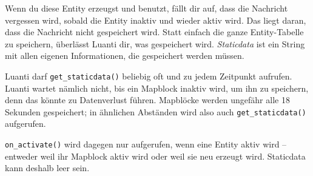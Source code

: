 Wenn du diese Entity erzeugst und benutzt, fällt dir auf, dass die
Nachricht vergessen wird, sobald die Entity inaktiv und wieder aktiv
wird. Das liegt daran, dass die Nachricht nicht gespeichert wird. Statt
einfach die ganze Entity-Tabelle zu speichern, überlässt Luanti dir, was
gespeichert wird. \emph{Staticdata} ist ein String mit allen eigenen
Informationen, die gespeichert werden müssen.

\begin{Shaded}
\begin{Highlighting}[]
 \OperatorTok{:}\OperatorTok{()}
     \OperatorTok{(\{}
         \OperatorTok{=} \OperatorTok{,}
    \OperatorTok{\})}

 \OperatorTok{:}\OperatorTok{(}\OperatorTok{,} \OperatorTok{)}
      \OperatorTok{\textasciitilde{}=}    \OperatorTok{\textasciitilde{}=}  
          \OperatorTok{=} \OperatorTok{(}\OperatorTok{)}  \OperatorTok{\{\}}
        \OperatorTok{:}\OperatorTok{(}\OperatorTok{)}
\end{Highlighting}
\end{Shaded}

Luanti darf \texttt{get\_\allowbreak{}staticdata()} beliebig oft und zu
jedem Zeitpunkt aufrufen. Luanti wartet nämlich nicht, bis ein
Mapblock inaktiv wird, um ihn zu speichern,
denn das könnte zu Datenverlust führen. Mapblöcke werden ungefähr alle
18 Sekunden gespeichert; in ähnlichen Abständen wird also auch
\texttt{get\_\allowbreak{}staticdata()} aufgerufen.

\texttt{on\_\allowbreak{}activate()}
wird dagegen nur aufgerufen, wenn eine Entity aktiv wird -- entweder
weil ihr Mapblock aktiv wird oder weil sie neu erzeugt wird. Staticdata
kann deshalb leer sein.

